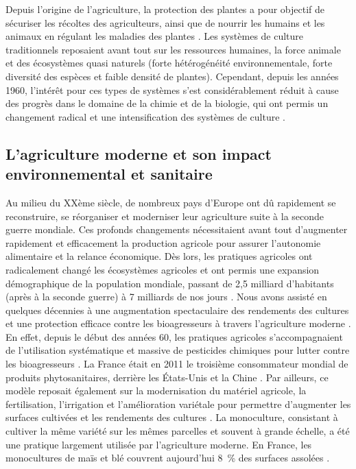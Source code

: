 	Depuis l'origine de l'agriculture, la protection des plantes a pour objectif de sécuriser les récoltes des agriculteurs, ainsi que de nourrir les humains et les animaux en  régulant les maladies des plantes \citep{Stukenbrock2008}. 
	Les systèmes de culture traditionnels reposaient avant tout sur les ressources humaines, la force animale et des écosystèmes quasi naturels (forte hétérogénéité  environnementale,  forte diversité des espèces et faible
densité de plantes). Cependant, depuis les années 1960, l'intérêt pour ces types de systèmes  s'est  considérablement réduit à cause des progrès dans le domaine de la chimie  et de la biologie, qui ont permis un changement radical et une intensification des systèmes de culture \citep{Meynard2003}.%


\subsection{L'agriculture moderne et son impact environnemental et sanitaire}

	 Au milieu du XXème siècle, de nombreux pays d'Europe ont dû rapidement se reconstruire, se réorganiser et moderniser leur agriculture suite à la seconde guerre mondiale. Ces profonds changements nécessitaient avant tout d'augmenter rapidement et efficacement la production agricole pour assurer l'autonomie alimentaire et la relance économique. Dès lors, les pratiques agricoles ont radicalement changé les écosystèmes agricoles et ont permis une expansion démographique de la population mondiale, passant de 2,5 milliard d'habitants (après à la seconde guerre) à 7 milliards  de nos jours   \citep{Gerland2014}. 
	Nous avons assisté en quelques décennies à une augmentation spectaculaire des rendements des cultures et une protection efficace contre les bioagresseurs à travers l'agriculture moderne \citep{FAO2017}. En effet, depuis le début des années 60,  les pratiques agricoles s'accompagnaient de l'utilisation systématique et massive de pesticides chimiques pour lutter contre les bioagresseurs \citep{Pretty2008,Butault2010, Tilman2001}.
La France était en 2011 le troisième consommateur mondial de produits phytosanitaires, derrière les États-Unis et la Chine \citep{Zhang2011}.  
	Par ailleurs, ce modèle reposait également  sur la modernisation du matériel agricole, la fertilisation, l'irrigation et l'amélioration variétale pour permettre d'augmenter les surfaces cultivées et les rendements des cultures \citep{Brisson2010, Grassini2013, Ray2012}.
La monoculture, consistant à cultiver la même variété sur les mêmes parcelles et souvent à grande échelle, a été une pratique largement utilisée par l'agriculture moderne.  En France, les monocultures de  maïs et  blé  couvrent aujourd’hui 8~\% des surfaces assolées \citep{Fuzeau2012}.

